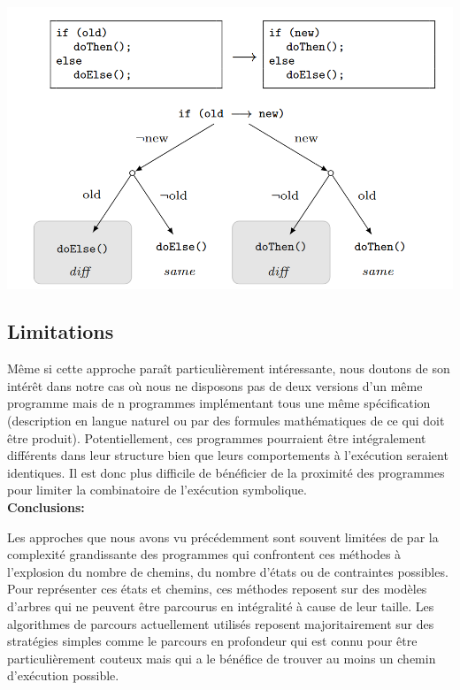 \begin{center}
    \includegraphics[scale=0.45]{../ressources/images/shadow_example.png}
    \label{shadow-example}
\end{center}


\subsection{Limitations}

Même si cette approche paraît particulièrement intéressante, nous doutons de son intérêt dans notre cas où nous ne disposons pas de deux versions d'un même programme mais de n programmes implémentant tous une même spécification (description en langue naturel ou par des formules mathématiques de ce qui doit être produit). 
Potentiellement, ces programmes pourraient être intégralement différents dans leur structure bien que leurs comportements à l'exécution seraient identiques. Il est donc plus difficile de bénéficier de la proximité des programmes pour limiter la combinatoire de l'exécution symbolique.\\

{\setlength{\parindent}{0cm}\textbf{Conclusions:}}

Les approches que nous avons vu précédemment sont souvent limitées\cite{test-auto-solved-yet} de par la complexité grandissante des programmes qui confrontent ces méthodes à l'explosion du nombre de chemins, du nombre d'états ou de contraintes possibles. Pour représenter ces états et chemins, ces méthodes reposent sur des modèles d'arbres qui ne peuvent être parcourus en intégralité à cause de leur taille. Les algorithmes de parcours actuellement utilisés reposent majoritairement sur des stratégies simples comme le parcours en profondeur qui est connu pour être particulièrement couteux mais qui a le bénéfice de trouver au moins un chemin d'exécution possible.

